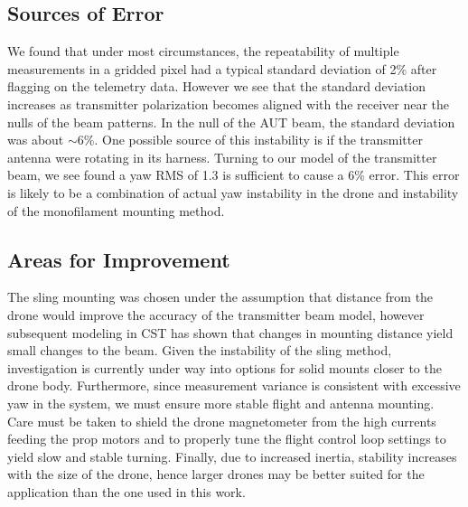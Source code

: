 \documentclass[preprint2,numberedappendix,tighten,twocolappendix]{aastex6}
\begin{document}
\subsection{Sources of Error}

We found that under most circumstances, the repeatability of multiple measurements in a gridded pixel had a typical standard deviation of 2\% after flagging on the telemetry data. However we see that the standard deviation increases as transmitter polarization becomes aligned with the receiver near the nulls of the beam patterns. In the null of the AUT beam, the standard deviation was about $\sim$6\%. One possible source of this instability is if the transmitter antenna were rotating in its harness. Turning to our model of the transmitter beam, we see found a yaw RMS of  1.3\arcdeg{} is sufficient to cause a 6\% error. This error is likely to be a combination of actual yaw instability in the drone and instability of the monofilament mounting method. 


\subsection{Areas for Improvement}

The sling mounting was chosen under the assumption that distance from the drone would improve the accuracy of the transmitter beam model, however subsequent modeling in CST has shown that changes in mounting distance yield small changes to the beam.  Given the instability of the sling method, investigation is currently under way into options for solid mounts closer to the drone body.  Furthermore, since measurement variance is consistent with excessive yaw in the system, we must ensure more stable flight and antenna mounting. Care must be taken to shield the drone magnetometer from the high currents feeding the prop motors and to properly tune the flight control loop settings to yield slow and stable turning.   Finally, due to increased inertia, stability increases with the size of the drone, hence larger drones may be better suited for the application than the one used in this work.
\end{document}

